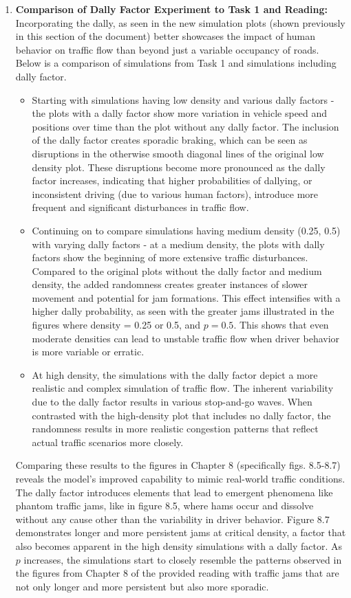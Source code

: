 \documentclass{article}
\begin{document}
\begin{enumerate}
    \item 
    \textbf{Comparison of Dally Factor Experiment to Task 1 and Reading:} Incorporating the dally, as seen in the new simulation plots (shown previously in this section of the document) better showcases the impact of human behavior on traffic flow than beyond just a variable occupancy of roads. Below is a comparison of simulations from Task 1 and simulations including dally factor. 
    \begin{itemize}
        \item 
        Starting with simulations having low density and various dally factors - the plots with a dally factor show more variation in vehicle speed and positions over time than the plot without any dally factor. The inclusion of the dally factor creates sporadic braking, which can be seen as disruptions in the otherwise smooth diagonal lines of the original low density plot. These disruptions become more pronounced as the dally factor increases, indicating that higher probabilities of dallying, or inconsistent driving (due to various human factors), introduce more frequent and significant disturbances in traffic flow. 

        \item 
        Continuing on to compare simulations having medium density (0.25, 0.5) with varying dally factors - at a medium density, the plots with dally factors show the beginning of more extensive traffic disturbances. Compared to the original plots without the dally factor and medium density, the added randomness creates greater instances of slower movement and potential for jam formations. This effect intensifies with a higher dally probability, as seen with the greater jams illustrated in the figures where density = 0.25 or 0.5, and $p = 0.5$. This shows that even moderate densities can lead to unstable traffic flow when driver behavior is more variable or erratic. 

        \item 
        At high density, the simulations with the dally factor depict a more realistic and complex simulation of traffic flow. The inherent variability due to the dally factor results in various stop-and-go waves. When contrasted with the high-density plot that includes no dally factor, the randomness results in more realistic congestion patterns that reflect actual traffic scenarios more closely. 
    \end{itemize}

    Comparing these results to the figures in Chapter 8 (specifically figs. 8.5-8.7) reveals the model's improved capability to mimic real-world traffic conditions. The dally factor introduces elements that lead to emergent phenomena like phantom traffic jams, like in figure 8.5, where hams occur and dissolve without any cause other than the variability in driver behavior. Figure 8.7 demonstrates longer and more persistent jams at critical density, a factor that also becomes apparent in the high density simulations with a dally factor. As $p$ increases, the simulations start to closely resemble the patterns observed in the figures from Chapter 8 of the provided reading with traffic jams that are not only longer and more persistent but also more sporadic. 


\end{enumerate}
\end{document}

